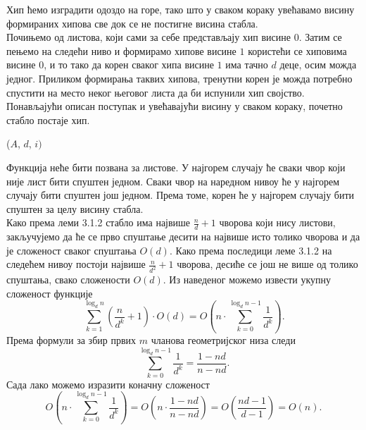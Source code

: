 \documentclass[11pt, a4paper]{article}
\theoremstyle{remark}
\numberwithin{equation}{section}
\begin{document}
	\indent Хип ћемо изградити одоздо на горе, тако што у сваком кораку увећавамо висину формираних хипова све док се не постигне висина стабла. \\
	\indent Почињемо од листова, који сами за себе представљају хип висине $0$. Затим се пењемо на следећи ниво и формирамо хипове висине $1$ користећи се хиповима висине $0$, и то тако да корен сваког хипа висине $1$ има тачно $d$ деце, осим можда једног. Приликом формирања таквих хипова, тренутни корен је можда потребно спустити на место неког његовог листа да би испунили хип својство. Понављајући описан поступак и увећавајући висину у сваком кораку, почетно стабло постаје хип.

	\begin{codebox}
		\li {}
		\li \Do
		($A$, $d$, $i)$
	\end{codebox}

	Функција  неће бити позвана за листове. У најгорем случају ће сваки чвор који није лист бити спуштен једном. Сваки чвор на наредном нивоу ће у најгорем случају бити спуштен још једном. Према томе, корен ће у најгорем случају бити спуштен за целу висину стабла. \\
	\indent Како према леми 3.1.2 стабло има највише $\frac{n}{d}+1$ чворова који нису листови, закључујемо да ће се прво спуштање десити на највише исто толико чворова и да је сложеност сваког спуштања $O(d)$. Како према последици леме 3.1.2 на следећем нивоу постоји највише $\frac{n}{d^2}+1$ чворова, десиће се још не више од толико спуштања, свако сложености $O(d)$. Из наведеног можемо извести укупну сложеност функције  \\
	\begin{equation}
	\sum_{k=1}^{\log_d n}\left(\frac{n}{d^k}+1 \right) \cdot O(d)=O\left (n \cdot \sum_{k=0}^{\log_d n-1}\frac{1}{d^k} \right).
	\end{equation}
	\indent Према формули за збир првих $m$ чланова геометријског низа следи
	\begin{equation}
	\sum_{k=0}^{\log_d n-1}\frac{1}{d^k}=\frac{1-nd}{n-nd}.
	\end{equation}
	\indent Сада лако можемо изразити коначну сложеност
	\begin{equation}
	O \left (n \cdot \sum_{k=0}^{\log_d n-1}\frac{1}{d^k} \right)=O \left (n\cdot \frac{1-nd}{n-nd} \right)=O\left(\frac{nd-1}{d-1} \right)=O(n).
	\end{equation}
\end{document}
